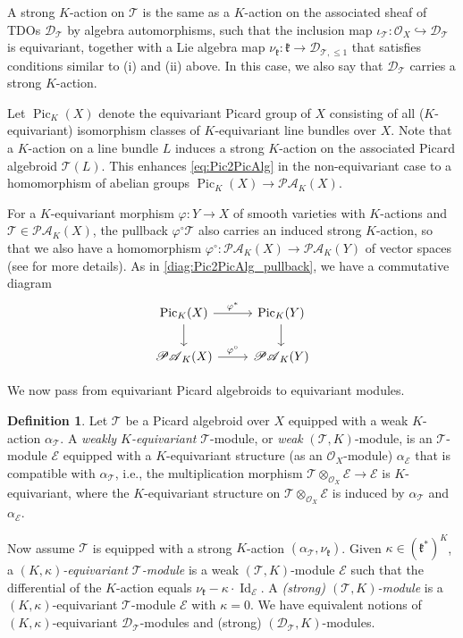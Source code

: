 \documentclass[11pt, a4paper]{amsart}
\newcommand{\fk}{\mathfrak{k}}
\newcommand{\cE}{\mathcal{E}}
\newcommand{\sD}{\mathscr{D}}
\DeclareMathOperator{\Pic}{Pic}
\newcommand{\Id}{\operatorname{Id}}
\newcommand{\TT}{\mathscr{T}}
\newcommand{\PicAlg}{\mathscr{PA}}
\newcommand{\OO}{\mathcal{O}}
\theoremstyle{definition}
\newtheorem{defi}[Thm]{Definition}
\numberwithin{equation}{section}
\begin{document}
A strong $K$-action on $\TT$ is the same as a $K$-action on the associated sheaf of TDOs $\mathscr{D}_\TT$ by algebra automorphisms, such that the inclusion map $\iota_\TT: \OO_X \hookrightarrow \mathscr{D}_\TT$ is equivariant, together with a Lie algebra map $\nu_\fk: \fk \to \mathscr{D}_{\TT, \leqslant 1}$ that satisfies conditions similar to (i) and (ii) above. In this case, we also say that $\mathscr{D}_\TT$ carries a strong $K$-action.

Let $\Pic_K(X)$ denote the equivariant Picard group of $X$ consisting of all ($K$-equivariant) isomorphism classes of $K$-equivariant line bundles over $X$. Note that a $K$-action on a line bundle $L$ induces a strong $K$-action on the associated Picard algebroid $\TT(L)$. This enhances \eqref{eq:Pic2PicAlg} in the non-equivariant case to a homomorphism of abelian groups $\Pic_K(X) \to \PicAlg_K(X)$.

For a $K$-equivariant morphism $\varphi: Y \to X$ of smooth varieties with $K$-actions and $\TT \in \PicAlg_K(X)$, the pullback $\varphi^\circ \TT$ also carries an induced strong $K$-action, so that we also have a homomorphism $\varphi^\circ: \PicAlg_K(X) \to \PicAlg_K(Y)$ of vector spaces (see \cite[Section 2.4]{Yu:period} for more details). As in \eqref{diag:Pic2PicAlg_pullback}, we have a commutative diagram 
\begin{equation} \label{eq:Pic2PicAlg_pullback_equiv}
	\begin{tikzcd}
		\Pic_K(X) \ar[r, "\varphi^*"] \ar[d] & \Pic_K(Y) \ar[d] \\
		\PicAlg_K(X) \ar[r, "\varphi^\circ"] & \PicAlg_K(Y)
	\end{tikzcd}
\end{equation}

We now pass from equivariant Picard algebroids to equivariant modules.

\begin{defi}\label{defn:pic_module_action}
	Let $\TT$ be a Picard algebroid over $X$ equipped with a weak $K$-action $\alpha_\TT$. A {\it weakly $K$-equivariant} $\TT$-module, or {\it weak} $(\TT, K)$-module, is an $\TT$-module $\cE$ equipped with a $K$-equivariant structure (as an $\OO_X$-module) $\alpha_\cE$ that is compatible with $\alpha_\TT$, i.e., the multiplication morphism $\TT \otimes_{\OO_X} \cE \to \cE$ is $K$-equivariant, where the $K$-equivariant structure on $\TT \otimes_{\OO_X} \cE$ is induced by $\alpha_\TT$ and $\alpha_\cE$.

	Now assume $\TT$ is equipped with a strong $K$-action $(\alpha_\TT, \nu_\fk)$. 
	Given $\kappa \in (\fk^*)^{K}$, a {\it $(K, \kappa)$-equivariant $\TT$-module} is a weak $(\TT, K)$-module $\cE$ such that the differential of the $K$-action equals $\nu_\fk - \kappa \cdot \Id_\cE$. A {\it (strong) $(\TT, K)$-module} is a $(K, \kappa)$-equivariant $\TT$-module $\cE$ with $\kappa = 0$. We have equivalent notions of $(K, \kappa)$-equivariant $\sD_\TT$-modules and (strong) $(\sD_\TT, K)$-modules.
\end{defi}
\end{document}
